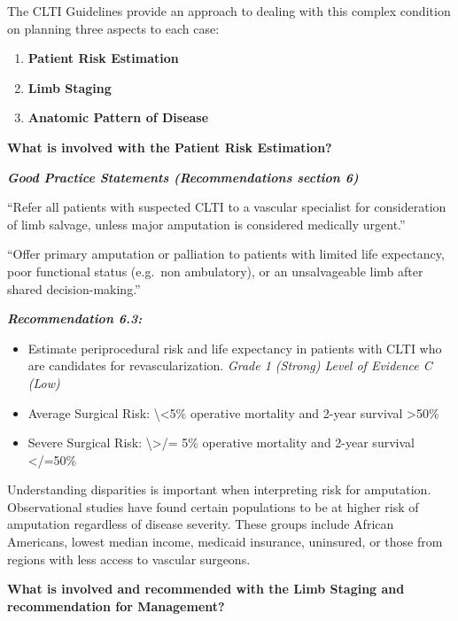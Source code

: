 \documentclass[
]{book}
\begin{document}
The CLTI Guidelines provide an approach to dealing with this complex
condition on planning three aspects to each case:

\begin{enumerate}
\def\labelenumi{\arabic{enumi}.}
\item
  \textbf{Patient Risk Estimation}
\item
  \textbf{Limb Staging}
\item
  \textbf{Anatomic Pattern of Disease}
\end{enumerate}

\textbf{What is involved with the Patient Risk Estimation?}

\textbf{\emph{Good Practice Statements (Recommendations section 6)}}

``Refer all patients with suspected CLTI to a vascular specialist for
consideration of limb salvage, unless major amputation is considered
medically urgent.''

``Offer primary amputation or palliation to patients with limited life
expectancy, poor functional status (e.g.~non ambulatory), or an
unsalvageable limb after shared decision-making.''

\textbf{\emph{Recommendation 6.3:}}

\begin{itemize}
\item
  Estimate periprocedural risk and life expectancy in patients with
  CLTI who are candidates for revascularization. \emph{Grade 1 (Strong)
  Level of Evidence C (Low)}
\item
  Average Surgical Risk: \textbackslash\textless5\% operative mortality and 2-year
  survival \textgreater50\%
\item
  Severe Surgical Risk: \textbackslash\textgreater/= 5\% operative mortality and 2-year
  survival \textless/=50\%
\end{itemize}

Understanding disparities is important when interpreting risk for
amputation. Observational studies have found certain populations to be
at higher risk of amputation regardless of disease severity. These groups
include African Americans, lowest median income, medicaid insurance,
uninsured, or those from regions with less access to vascular
surgeons.\citep{hughes2019, ho2005, eslami2007}

\textbf{What is involved and recommended with the Limb Staging and
recommendation for Management?}
\end{document}
